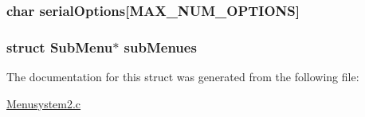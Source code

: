 \hypertarget{struct_sub_menu_adcfcbb5b5340baf34c70fb8f4cc66f72}{
\subsubsection[{serial\+Options}]{\setlength{\rightskip}{0pt plus 5cm}char serial\+Options\mbox{[}{\bf M\+A\+X\+\_\+\+N\+U\+M\+\_\+\+O\+P\+T\+I\+O\+N\+S}\mbox{]}}}\label{struct_sub_menu_adcfcbb5b5340baf34c70fb8f4cc66f72}
\hypertarget{struct_sub_menu_a915aa121e09e4c3f914dc59727f390e3}{
\subsubsection[{sub\+Menues}]{\setlength{\rightskip}{0pt plus 5cm}struct {\bf Sub\+Menu}$\ast$ sub\+Menues}}\label{struct_sub_menu_a915aa121e09e4c3f914dc59727f390e3}


The documentation for this struct was generated from the following file\+:\begin{DoxyCompactItemize}
\item 
\hyperlink{_menusystem2_8c}{Menusystem2.\+c}\end{DoxyCompactItemize}
